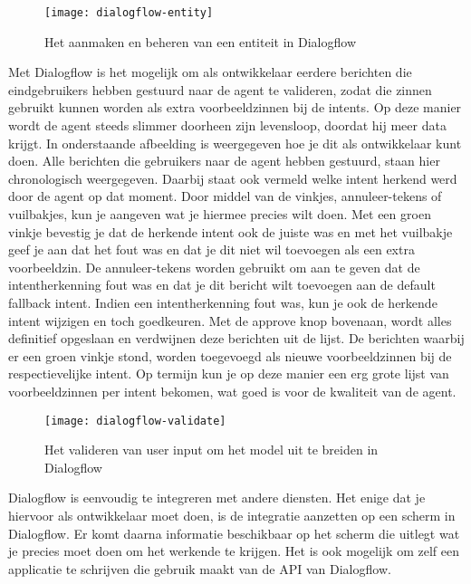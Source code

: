 \begin{figure}[H]
    \label{fig:dialogflow-entity}
    \centering
    \texttt{[image: dialogflow-entity]}
    \caption{Het aanmaken en beheren van een entiteit in Dialogflow}
\end{figure}

Met Dialogflow is het mogelijk om als ontwikkelaar eerdere berichten die eindgebruikers hebben gestuurd naar de agent te valideren, zodat die zinnen gebruikt kunnen worden als extra voorbeeldzinnen bij de intents. Op deze manier wordt de agent steeds slimmer doorheen zijn levensloop, doordat hij meer data krijgt. In onderstaande afbeelding is weergegeven hoe je dit als ontwikkelaar kunt doen. Alle berichten die gebruikers naar de agent hebben gestuurd, staan hier chronologisch weergegeven. Daarbij staat ook vermeld welke intent herkend werd door de agent op dat moment. Door middel van de vinkjes, annuleer-tekens of vuilbakjes, kun je aangeven wat je hiermee precies wilt doen. Met een groen vinkje bevestig je dat de herkende intent ook de juiste was en met het vuilbakje geef je aan dat het fout was en dat je dit niet wil toevoegen als een extra voorbeeldzin. De annuleer-tekens worden gebruikt om aan te geven dat de intentherkenning fout was en dat je dit bericht wilt toevoegen aan de default fallback intent. Indien een intentherkenning fout was, kun je ook de herkende intent wijzigen en toch goedkeuren. Met de approve knop bovenaan, wordt alles definitief opgeslaan en verdwijnen deze berichten uit de lijst. De berichten waarbij er een groen vinkje stond, worden toegevoegd als nieuwe voorbeeldzinnen bij de respectievelijke intent. Op termijn kun je op deze manier een erg grote lijst van voorbeeldzinnen per intent bekomen, wat goed is voor de kwaliteit van de agent.

\begin{figure}[H]
    \label{fig:dialogflow-validate}
    \centering
    \texttt{[image: dialogflow-validate]}
    \caption{Het valideren van user input om het model uit te breiden in Dialogflow}
\end{figure}

Dialogflow is eenvoudig te integreren met andere diensten. Het enige dat je hiervoor als ontwikkelaar moet doen, is de integratie aanzetten op een scherm in Dialogflow. Er komt daarna informatie beschikbaar op het scherm die uitlegt wat je precies moet doen om het werkende te krijgen. Het is ook mogelijk om zelf een applicatie te schrijven die gebruik maakt van de API van Dialogflow.

